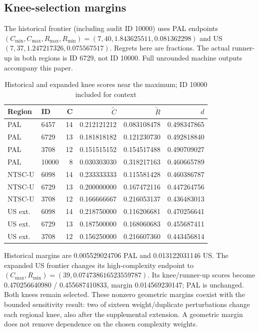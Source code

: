 \documentclass[11pt]{article}
\theoremstyle{definition}\newtheorem{definition}[theorem]{Definition}
\begin{document}
\subsection{Knee-selection margins}
The historical frontier (including audit ID 10000) uses PAL endpoints $(C_{\min},C_{\max},R_{\max},R_{\min})=(7,40,1.843625511,0.081362298)$ and US $(7,37,1.247217326,0.075567517)$. Regrets here are fractions. The actual runner-up in both regions is ID 6729, not ID 10000. Full unrounded machine outputs accompany this paper.
\begin{table}[H]\centering\small
\begin{tabular}{llrrrr}\toprule
Region & ID & C & $\widetilde C$ & $\widetilde R$ & $d$\\\midrule
PAL & 6457 & 14 & 0.212121212 & 0.083108478 & 0.498347865\\
PAL & 6729 & 13 & 0.181818182 & 0.121230730 & 0.492818840\\
PAL & 3708 & 12 & 0.151515152 & 0.154517488 & 0.490709027\\
PAL & 10000 & 8 & 0.030303030 & 0.318217163 & 0.460665789\\
NTSC-U & 6098 & 14 & 0.233333333 & 0.115581428 & 0.460386787\\
NTSC-U & 6729 & 13 & 0.200000000 & 0.167472116 & 0.447264756\\
NTSC-U & 3708 & 12 & 0.166666667 & 0.216053137 & 0.436483013\\
US ext. & 6098 & 14 & 0.218750000 & 0.116206681 & 0.470256641\\
US ext. & 6729 & 13 & 0.187500000 & 0.168060683 & 0.455687411\\
US ext. & 3708 & 12 & 0.156250000 & 0.216607360 & 0.443456814\\
\bottomrule\end{tabular}
\caption{Historical and expanded knee scores near the maximum; ID 10000 included for context}\label{tab:knee-margins}\end{table}
Historical margins are 0.005529024706 PAL and 0.013122031146 US. The expanded US frontier changes its high-complexity endpoint to $(C_{\max},R_{\min})=(39,0.074738616523559787)$. Its knee/runner-up scores become 0.470256640980 / 0.455687410833, margin 0.014569230147; PAL is unchanged. Both knees remain selected. These nonzero geometric margins coexist with the bounded sensitivity result: two of sixteen weight/duplicate perturbations change each regional knee, also after the supplemental extension. A geometric margin does not remove dependence on the chosen complexity weights.
\end{document}
